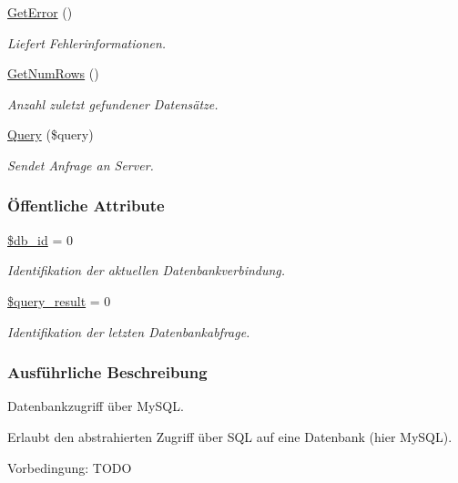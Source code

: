 \begin{CompactItemize}
\hyperlink{classSQLDB_efc9afe11649d6cdae21575717ec3436}{Get\-Error} ()
\begin{CompactList}\small\item\em Liefert Fehlerinformationen. \item\end{CompactList}\item 
\hyperlink{classSQLDB_15b181251b309ab55331be29fa33ac9f}{Get\-Num\-Rows} ()
\begin{CompactList}\small\item\em Anzahl zuletzt gefundener Datensätze. \item\end{CompactList}\item 
\hyperlink{classSQLDB_fc6ffa8df50f68f07d9f5e3385b96d7a}{Query} (\$query)
\begin{CompactList}\small\item\em Sendet Anfrage an Server. \item\end{CompactList}\end{CompactItemize}
\subsubsection*{\"{O}ffentliche Attribute}
\begin{CompactItemize}
\item 
\hyperlink{classSQLDB_2c62843044a6ec53ad3384fb36aa811b}{\$db\_\-id} = 0
\begin{CompactList}\small\item\em Identifikation der aktuellen Datenbankverbindung. \item\end{CompactList}\item 
\hyperlink{classSQLDB_879fa41a3df6664f4ce83960808326ab}{\$query\_\-result} = 0
\begin{CompactList}\small\item\em Identifikation der letzten Datenbankabfrage. \item\end{CompactList}\end{CompactItemize}


\subsubsection{Ausf\"{u}hrliche Beschreibung}
Datenbankzugriff über My\-SQL. 

Erlaubt den abstrahierten Zugriff über SQL auf eine Datenbank (hier My\-SQL). \begin{Desc}
\item[Vorbedingung:]TODO \end{Desc}




